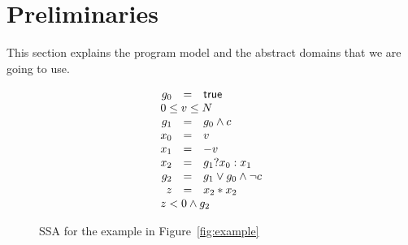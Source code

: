 \section{Preliminaries}
This section explains the program model and the abstract domains that
we are going to use.

\begin{figure}
\[
\begin{array}{rcl}
g_0 &=& \true \\
\multicolumn{3}{l}{0 \leq v\leq N} \\
g_1 &=& g_0\wedge c\\
x_0 &=& v \\
x_1 &=& -v \\
x_2 &=& g_1?x_0:x_1 \\
g_2 &=& g_1 \vee g_0\wedge \neg c\\
z &=& x_2 * x_2 \\
\multicolumn{3}{l}{z<0 \wedge g_2}
\end{array}
\]
\caption{\label{fig:ssa}
SSA for the example in Figure~\ref{fig:example}
}
\end{figure}

